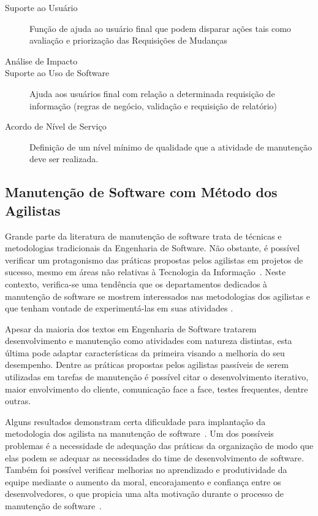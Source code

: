 \begin{description}
	\item[Suporte ao Usuário] Função de ajuda ao usuário final que podem
		disparar ações tais como avaliação e priorização das Requisições de
		Mudanças
	\item [Análise de Impacto] 
	\item [Suporte ao Uso de Software] Ajuda aos usuários final com relação a
		determinada requisição de informação (regras de negócio, validação e
		requisição de relatório)
	\item [Acordo de Nível de Serviço] Definição de um nível mínimo de qualidade
		que a atividade de manutenção deve ser realizada.	
\end{description}

\subsection{Manutenção de Software com Método dos Agilistas}
\label{sub:manutenção_de_software_com_método_dos_agilistas}

Grande parte da literatura de manutenção de software trata de técnicas e
metodologias tradicionais da Engenharia de Software. Não obstante, é possível
verificar um protagonismo das práticas propostas pelos agilistas em projetos de
sucesso, mesmo em áreas não relativas à Tecnologia da
Informação~\cite{Serrador2015}. Neste contexto, verifica-se uma tendência que os
departamentos dedicados à manutenção de software se mostrem interessados nas
metodologias dos agilistas e que tenham vontade de experimentá-las em suas
atividades \cite{Heeager2015}.

Apesar da maioria dos textos em Engenharia de Software tratarem desenvolvimento
e manutenção como atividades com natureza distintas, esta última pode adaptar
características da primeira visando a melhoria do seu desempenho. Dentre as
práticas propostas pelos agilistas passíveis de serem utilizadas em tarefas de
manutenção é possível citar o desenvolvimento iterativo, maior envolvimento do
cliente, comunicação face a face, testes frequentes, dentre outras.

Alguns resultados demonstram certa dificuldade para implantação da metodologia
dos agilista na manutenção de software~\cite{1402140}. Um dos possíveis
problemas é a necessidade de adequação das práticas da organização de modo que
elas podem se adequar as necessidades do time de desenvolvimento de software.
Também foi possível verificar melhorias no aprendizado e produtividade da equipe
mediante o aumento da moral, encorajamento e confiança entre os desenvolvedores,
o que propicia uma alta motivação durante o processo de manutenção de
software~\cite{Choudhari:2014:EIM:2557833.2557845}.

